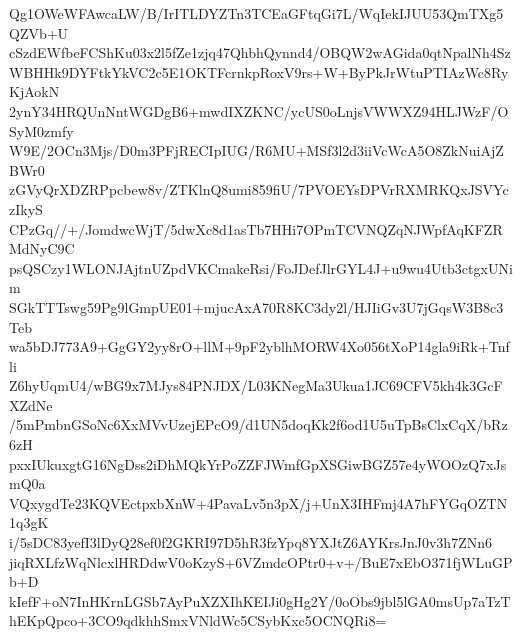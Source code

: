 Qg1OWeWFAwcaLW/B/IrITLDYZTn3TCEaGFtqGi7L/WqIekIJUU53QmTXg5QZVb+U
cSzdEWfbeFCShKu03x2l5fZe1zjq47QhbhQynnd4/OBQW2wAGida0qtNpalNh4Sz
WBHHk9DYFtkYkVC2c5E1OKTFcrnkpRoxV9rs+W+ByPkJrWtuPTIAzWc8RyKjAokN
2ynY34HRQUnNntWGDgB6+mwdIXZKNC/ycUS0oLnjsVWWXZ94HLJWzF/OSyM0zmfy
W9E/2OCn3Mjs/D0m3PFjRECIpIUG/R6MU+MSf3l2d3iiVcWcA5O8ZkNuiAjZBWr0
zGVyQrXDZRPpcbew8v/ZTKlnQ8umi859fiU/7PVOEYsDPVrRXMRKQxJSVYczIkyS
CPzGq//+/JomdwcWjT/5dwXc8d1asTb7HHi7OPmTCVNQZqNJWpfAqKFZRMdNyC9C
psQSCzy1WLONJAjtnUZpdVKCmakeRsi/FoJDefJlrGYL4J+u9wu4Utb3ctgxUNim
SGkTTTswg59Pg9lGmpUE01+mjucAxA70R8KC3dy2l/HJIiGv3U7jGqsW3B8c3Teb
wa5bDJ773A9+GgGY2yy8rO+llM+9pF2yblhMORW4Xo056tXoP14gla9iRk+Tnfli
Z6hyUqmU4/wBG9x7MJys84PNJDX/L03KNegMa3Ukua1JC69CFV5kh4k3GcFXZdNe
/5mPmbnGSoNc6XxMVvUzejEPcO9/d1UN5doqKk2f6od1U5uTpBsClxCqX/bRz6zH
pxxIUkuxgtG16NgDss2iDhMQkYrPoZZFJWmfGpXSGiwBGZ57e4yWOOzQ7xJsmQ0a
VQxygdTe23KQVEctpxbXnW+4PavaLv5n3pX/j+UnX3IHFmj4A7hFYGqOZTN1q3gK
i/5sDC83yefI3lDyQ28ef0f2GKRI97D5hR3fzYpq8YXJtZ6AYKrsJnJ0v3h7ZNn6
jiqRXLfzWqNlcxlHRDdwV0oKzyS+6VZmdcOPtr0+v+/BuE7xEbO371fjWLuGPb+D
kIefF+oN7InHKrnLGSb7AyPuXZXIhKEIJi0gHg2Y/0oObs9jbl5lGA0msUp7aTzT
hEKpQpco+3CO9qdkhhSmxVNldWc5CSybKxc5OCNQRi8=
